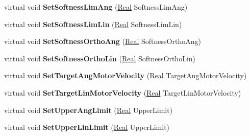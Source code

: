 \begin{DoxyCompactItemize}
\item 
\hypertarget{classphys_1_1SliderConstraint_a8b098fda35892a8e9ae1cca00c1d9a44}{
virtual void {\bfseries SetSoftnessLimAng} (\hyperlink{namespacephys_af7eb897198d265b8e868f45240230d5f}{Real} SoftnessLimAng)}
\label{classphys_1_1SliderConstraint_a8b098fda35892a8e9ae1cca00c1d9a44}

\item 
\hypertarget{classphys_1_1SliderConstraint_a4ecd03e28d90b4dd75059e766df53bc7}{
virtual void {\bfseries SetSoftnessLimLin} (\hyperlink{namespacephys_af7eb897198d265b8e868f45240230d5f}{Real} SoftnessLimLin)}
\label{classphys_1_1SliderConstraint_a4ecd03e28d90b4dd75059e766df53bc7}

\item 
\hypertarget{classphys_1_1SliderConstraint_a4840ed43bbe8b99fb9c33a3da2c97548}{
virtual void {\bfseries SetSoftnessOrthoAng} (\hyperlink{namespacephys_af7eb897198d265b8e868f45240230d5f}{Real} SoftnessOrthoAng)}
\label{classphys_1_1SliderConstraint_a4840ed43bbe8b99fb9c33a3da2c97548}

\item 
\hypertarget{classphys_1_1SliderConstraint_a9821ecd0d7e2dbef81fdb41e5bdfd35a}{
virtual void {\bfseries SetSoftnessOrthoLin} (\hyperlink{namespacephys_af7eb897198d265b8e868f45240230d5f}{Real} SoftnessOrthoLin)}
\label{classphys_1_1SliderConstraint_a9821ecd0d7e2dbef81fdb41e5bdfd35a}

\item 
\hypertarget{classphys_1_1SliderConstraint_a69efafef3a61ae10836e877e71e2d84c}{
virtual void {\bfseries SetTargetAngMotorVelocity} (\hyperlink{namespacephys_af7eb897198d265b8e868f45240230d5f}{Real} TargetAngMotorVelocity)}
\label{classphys_1_1SliderConstraint_a69efafef3a61ae10836e877e71e2d84c}

\item 
\hypertarget{classphys_1_1SliderConstraint_ab07bdade9527e4f3f8de868110ee85fa}{
virtual void {\bfseries SetTargetLinMotorVelocity} (\hyperlink{namespacephys_af7eb897198d265b8e868f45240230d5f}{Real} TargetLinMotorVelocity)}
\label{classphys_1_1SliderConstraint_ab07bdade9527e4f3f8de868110ee85fa}

\item 
\hypertarget{classphys_1_1SliderConstraint_a2800b68f67f4fea4f3d94b9cc49ff42c}{
virtual void {\bfseries SetUpperAngLimit} (\hyperlink{namespacephys_af7eb897198d265b8e868f45240230d5f}{Real} UpperLimit)}
\label{classphys_1_1SliderConstraint_a2800b68f67f4fea4f3d94b9cc49ff42c}

\item 
\hypertarget{classphys_1_1SliderConstraint_ada810899070a3bd97739e31dce2825b4}{
virtual void {\bfseries SetUpperLinLimit} (\hyperlink{namespacephys_af7eb897198d265b8e868f45240230d5f}{Real} UpperLimit)}
\label{classphys_1_1SliderConstraint_ada810899070a3bd97739e31dce2825b4}


\end{DoxyCompactItemize}
